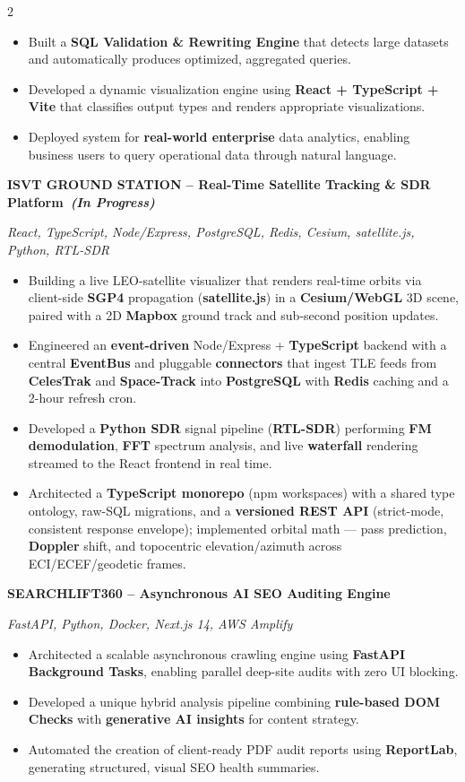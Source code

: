 \documentclass[11pt,a4paper,ragged2e,withhyper]{altacv}
\newcommand{\projecttitle}[1]{%
  \par\smallskip
  \needspace{4\baselineskip}%
  {\textcolor{VividPurple}{\normalsize\bfseries #1}}\par
}
\newcommand{\projectstack}[1]{%
  {\footnotesize\itshape #1}\par\vspace{0.5mm}
}
\newcommand{\projectsep}{%
  \par\vspace{1mm}
  {\color{gray!35}\noindent\makebox[\linewidth]{\dotfill}}
  \par\vspace{1mm}
}
\begin{document}
\begin{paracol}{2}
\begin{itemize}
\item Built a \textbf{SQL Validation \& Rewriting Engine} that detects large datasets and automatically produces optimized, aggregated queries.
\item Developed a dynamic visualization engine using \textbf{React + TypeScript + Vite} that classifies output types and renders appropriate visualizations.
\item Deployed system for \textbf{real-world enterprise} data analytics, enabling business users to query operational data through natural language.
\end{itemize}
\projectsep
\projecttitle{ISVT GROUND STATION -- Real-Time Satellite Tracking \& SDR Platform~{\normalfont\itshape\footnotesize\color{LightGrey}(In Progress)}}
\projectstack{React, TypeScript, Node/Express, PostgreSQL, Redis, Cesium, satellite.js, Python, RTL-SDR}
\begin{itemize}
\item Building a live LEO-satellite visualizer that renders real-time orbits via client-side \textbf{SGP4} propagation (\textbf{satellite.js}) in a \textbf{Cesium/WebGL} 3D scene, paired with a 2D \textbf{Mapbox} ground track and sub-second position updates.
\item Engineered an \textbf{event-driven} Node/Express + \textbf{TypeScript} backend with a central \textbf{EventBus} and pluggable \textbf{connectors} that ingest TLE feeds from \textbf{CelesTrak} and \textbf{Space-Track} into \textbf{PostgreSQL} with \textbf{Redis} caching and a 2-hour refresh cron.
\item Developed a \textbf{Python SDR} signal pipeline (\textbf{RTL-SDR}) performing \textbf{FM demodulation}, \textbf{FFT} spectrum analysis, and live \textbf{waterfall} rendering streamed to the React frontend in real time.
\item Architected a \textbf{TypeScript monorepo} (npm workspaces) with a shared type ontology, raw-SQL migrations, and a \textbf{versioned REST API} (strict-mode, consistent response envelope); implemented orbital math --- pass prediction, \textbf{Doppler} shift, and topocentric elevation/azimuth across ECI/ECEF/geodetic frames.
\end{itemize}
\projectsep
\projecttitle{SEARCHLIFT360 -- Asynchronous AI SEO Auditing Engine}
\projectstack{FastAPI, Python, Docker, Next.js 14, AWS Amplify}
\begin{itemize}
\item Architected a scalable asynchronous crawling engine using \textbf{FastAPI Background Tasks}, enabling parallel deep-site audits with zero UI blocking.
\item Developed a unique hybrid analysis pipeline combining \textbf{rule-based DOM Checks} with \textbf{generative AI insights} for content strategy.
\item Automated the creation of client-ready PDF audit reports using \textbf{ReportLab}, generating structured, visual SEO health summaries.
\end{itemize}
\end{paracol}
\end{document}
